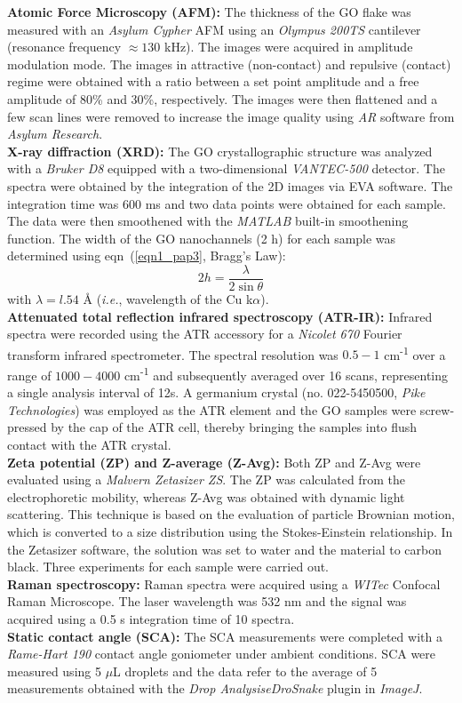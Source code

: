 \textbf{Atomic Force Microscopy (AFM):} The thickness of the GO flake was measured with an \textit{Asylum Cypher} AFM using an \textit{Olympus 200TS} cantilever (resonance frequency $\approx130$ kHz). The images were acquired in amplitude modulation mode. The images in attractive (non-contact) and repulsive (contact) regime were obtained with a ratio between a set point amplitude and a free amplitude of 80\% and 30\%, respectively. The images were then flattened and a few scan lines were removed to increase the image quality using \textit{AR} software from \textit{Asylum Research}.\\
\textbf{X-ray diffraction (XRD):} The GO crystallographic structure was analyzed with a \textit{Bruker D8} equipped with a two-dimensional \textit{VANTEC-500} detector. The spectra were obtained by the integration of the 2D images via EVA software. The integration time was 600 ms and two data points were obtained for each sample. The data were then smoothened with the \textit{MATLAB} built-in smoothening function. The width of the GO nanochannels (2 h) for each sample was determined using eqn~(\ref{eqn1_pap3}, Bragg's Law): 
\begin{equation}
  2h ={\dfrac{\lambda}{2\sin\theta}}
 \label{eqn1_pap3}
\end{equation}
with $\lambda=l.54$ {\AA} (\textit{i.e.}, wavelength of the Cu k$\alpha$).\\
\textbf{Attenuated total reflection infrared spectroscopy (ATR-IR):} Infrared spectra were recorded using the ATR accessory for a \textit{Nicolet 670} Fourier transform infrared spectrometer. The spectral resolution was $0.5-1$ cm\textsuperscript{-1} over a range of $1000-4000$ cm\textsuperscript{-1} and subsequently averaged over 16 scans, representing a single analysis interval of 12s. A germanium crystal (no. 022-5450500, \textit{Pike Technologies}) was employed as the ATR element and the GO samples were screw-pressed by the cap of the ATR cell, thereby bringing the samples into flush contact with the ATR crystal.\\
\textbf{Zeta potential (ZP) and Z-average (Z-Avg):} Both ZP and Z-Avg were evaluated using a \textit{Malvern Zetasizer ZS}. The ZP was calculated from the electrophoretic mobility, whereas Z-Avg was obtained with dynamic light scattering. This technique is based on the evaluation of particle Brownian motion, which is converted to a size distribution using the Stokes-Einstein relationship. In the Zetasizer software, the solution was set to water and the material to carbon black. Three experiments for each sample were carried out.\\
\textbf{Raman spectroscopy:} Raman spectra were acquired using a \textit{WITec} Confocal Raman Microscope. The laser wavelength was 532 nm and the signal was acquired using a 0.5 s integration time of 10 spectra.\\
\textbf{Static contact angle (SCA):} The SCA measurements were completed with a \textit{Rame-Hart 190} contact angle goniometer under ambient conditions. SCA were measured using 5 $\mu$L droplets and the data refer to the average of 5 measurements obtained with the \textit{Drop AnalysiseDroSnake} plugin in \textit{ImageJ}.

